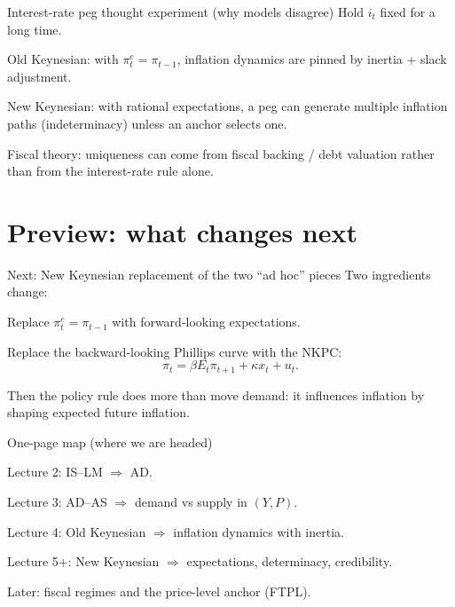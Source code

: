 \documentclass[aspectratio=169,xcolor=dvipsnames]{beamer}
\let\tempone\itemize
\let\temptwo\enditemize
\renewenvironment{itemize}{\tempone\addtolength{\itemsep}{\fill}}{\temptwo}
\let\tempa\enumerate
\let\tempb\endenumerate
\renewenvironment{enumerate}{\tempa\addtolength{\itemsep}{\fill}}{\tempb}
\begin{document}
\begin{frame}{Interest-rate peg thought experiment (why models disagree)}
\small
Hold $i_t$ fixed for a long time.

\begin{itemize}
\item Old Keynesian: with $\pi_t^{e}=\pi_{t-1}$, inflation dynamics are pinned by inertia + slack adjustment.
\item New Keynesian: with rational expectations, a peg can generate multiple inflation paths (indeterminacy) unless an anchor selects one.
\item Fiscal theory: uniqueness can come from fiscal backing / debt valuation rather than from the interest-rate rule alone.
\end{itemize}
\end{frame}

\section[Preview]{Preview: what changes next}

\begin{frame}{Next: New Keynesian replacement of the two ``ad hoc'' pieces}
\small
Two ingredients change:
\begin{enumerate}
\item Replace $\pi_t^{e}=\pi_{t-1}$ with forward-looking expectations.
\item Replace the backward-looking Phillips curve with the NKPC:
\[
\pi_t = \beta E_t\pi_{t+1} + \kappa x_t + u_t.
\]
\end{enumerate}

\vspace{0.3em}
\small
Then the policy rule does more than move demand: it influences inflation by shaping expected future inflation.
\end{frame}

\begin{frame}{One-page map (where we are headed)}
\small
\begin{itemize}
\item Lecture 2: IS--LM $\Rightarrow$ AD.
\item Lecture 3: AD--AS $\Rightarrow$ demand vs supply in $(Y,P)$.
\item Lecture 4: Old Keynesian $\Rightarrow$ inflation dynamics with inertia.
\item Lecture 5+: New Keynesian $\Rightarrow$ expectations, determinacy, credibility.
\item Later: fiscal regimes and the price-level anchor (FTPL).
\end{itemize}
\end{frame}
\end{document}
